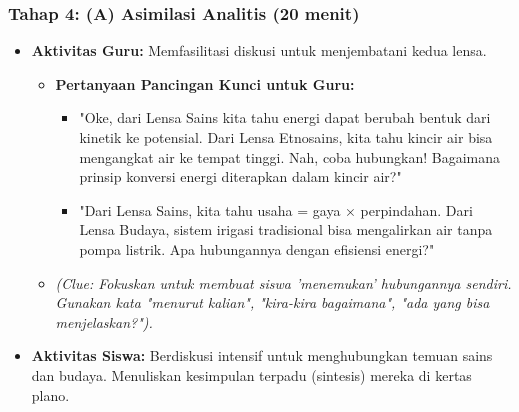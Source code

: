 \documentclass[12pt,a4paper]{article}
\begin{document}
\subsubsection{Tahap 4: (A) Asimilasi Analitis (20 menit)}
\begin{itemize}
\item \textbf{Aktivitas Guru:} Memfasilitasi diskusi untuk menjembatani kedua lensa.
    \begin{itemize}
    \item \textbf{Pertanyaan Pancingan Kunci untuk Guru:}
        \begin{itemize}
        \item "Oke, dari Lensa Sains kita tahu energi dapat berubah bentuk dari kinetik ke potensial. Dari Lensa Etnosains, kita tahu kincir air bisa mengangkat air ke tempat tinggi. Nah, coba hubungkan! Bagaimana prinsip konversi energi diterapkan dalam kincir air?"
        \item "Dari Lensa Sains, kita tahu usaha = gaya × perpindahan. Dari Lensa Budaya, sistem irigasi tradisional bisa mengalirkan air tanpa pompa listrik. Apa hubungannya dengan efisiensi energi?"
        \end{itemize}
    \item \textit{(Clue: Fokuskan untuk membuat siswa 'menemukan' hubungannya sendiri. Gunakan kata "menurut kalian", "kira-kira bagaimana", "ada yang bisa menjelaskan?").}
    \end{itemize}
\item \textbf{Aktivitas Siswa:} Berdiskusi intensif untuk menghubungkan temuan sains dan budaya. Menuliskan kesimpulan terpadu (sintesis) mereka di kertas plano.
\end{itemize}
\end{document}
